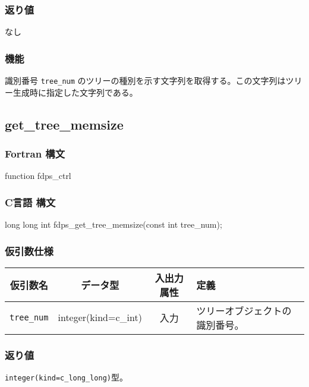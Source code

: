 \subsubsection*{返り値}
なし

\subsubsection*{機能}
識別番号 \texttt{tree\_num} のツリーの種別を示す文字列を取得する。この文字列はツリー生成時に指定した文字列である。 
\clearpage

\subsection{get\_tree\_memsize}
\subsubsection*{Fortran 構文}
\begin{screen}
\begin{spverbatim}
function fdps_ctrl%
\end{spverbatim}
\end{screen}

\subsubsection*{C言語 構文}
\begin{screen}
\begin{spverbatim}
long long int fdps_get_tree_memsize(const int tree_num);
\end{spverbatim}
\end{screen}

\subsubsection*{仮引数仕様}
\begin{table}[h]
\begin{tabularx}{\linewidth}{cccX}
\toprule
\rowcolor{Snow2}
仮引数名 & データ型 & 入出力属性 & 定義 \\
\midrule
\verb|tree_num|  & integer(kind=c\_int)  & 入力   & ツリーオブジェクトの識別番号。\\
\bottomrule
\end{tabularx}
\end{table}

\subsubsection*{返り値}
\verb|integer(kind=c_long_long)|型。

